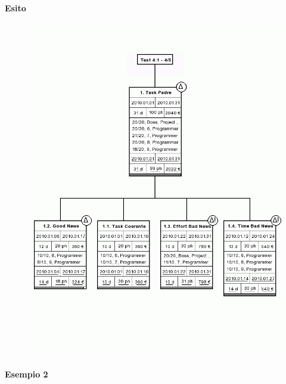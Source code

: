 \paragraph{Esito}
\begin{figure}
\centering
\includegraphics[width=\textwidth]{tests/TEST_WBS/4.1/4.1_4_5/Esempio_1/output.png}
\end{figure}
\newpage

\paragraph{Esempio 2}
